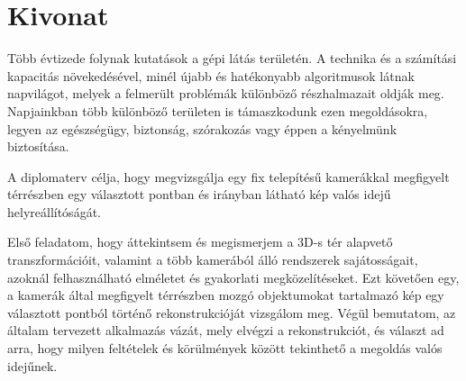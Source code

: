 \chapter*{Kivonat}

Több évtizede folynak kutatások a gépi látás területén. A technika és a számítási kapacitás növekedésével, minél újabb és hatékonyabb algoritmusok látnak napvilágot, melyek a felmerült problémák különböző részhalmazait oldják meg. Napjainkban több különböző területen is támaszkodunk ezen megoldásokra, legyen az egészségügy, biztonság, szórakozás vagy éppen a kényelmünk biztosítása.


A diplomaterv célja, hogy megvizsgálja egy fix telepítésű kamerákkal megfigyelt térrészben egy választott pontban és irányban látható kép valós idejű helyreállítóságát.

Első feladatom, hogy áttekintsem és megismerjem a 3D-s tér alapvető transzformációit, valamint a több kamerából álló rendszerek sajátosságait, azoknál felhasználható elméletet és gyakorlati megközelítéseket. Ezt követően egy, a kamerák által megfigyelt térrészben mozgó objektumokat tartalmazó kép egy választott pontból történő rekonstrukcióját vizsgálom meg. Végül bemutatom, az általam tervezett alkalmazás vázát, mely elvégzi a rekonstrukciót, és választ ad arra, hogy milyen feltételek és körülmények között tekinthető a megoldás valós idejűnek.

\vfill



